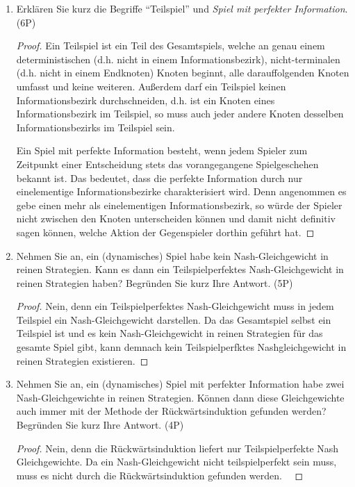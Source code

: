 \documentclass[12pt]{article}
\begin{document}
\begin{enumerate}[label=\alph*\upshape)]
	\item Erklären Sie kurz die Begriffe \enquote{Teilspiel} und \textit{Spiel mit perfekter Information}. (6P)
		\begin{proof}
			Ein Teilspiel ist ein Teil des Gesamtspiels, welche an genau einem deterministischen (d.h. nicht in einem Informationsbezirk), nicht-terminalen (d.h. nicht in einem Endknoten) Knoten beginnt, alle darauffolgenden Knoten umfasst und keine weiteren. Außerdem darf ein Teilspiel keinen Informationsbezirk durchschneiden, d.h. ist ein Knoten eines Informationsbezirk im Teilspiel, so muss auch jeder andere Knoten desselben Informationsbezirks im Teilspiel sein. ~\smallskip
			
			Ein Spiel mit perfekte Information besteht, wenn jedem Spieler zum Zeitpunkt einer Entscheidung stets das vorangegangene Spielgeschehen bekannt ist. Das bedeutet, dass die perfekte Information durch nur einelementige Informationsbezirke charakterisiert wird. Denn angenommen es gebe einen mehr als einelementigen Informationsbezirk, so würde der Spieler nicht zwischen den Knoten unterscheiden können und damit nicht definitiv sagen können, welche Aktion der Gegenspieler dorthin geführt hat.
		\end{proof}
	\item Nehmen Sie an, ein (dynamisches) Spiel habe kein Nash-Gleichgewicht in reinen Strategien. Kann es dann ein Teilspielperfektes Nash-Gleichgewicht in reinen Strategien haben? Begründen Sie kurz Ihre Antwort. (5P)
		\begin{proof}
			Nein, denn ein Teilspielperfektes Nash-Gleichgewicht muss in jedem Teilspiel ein Nash-Gleichgewicht darstellen. Da das Gesamtspiel selbst ein Teilspiel ist und es kein Nash-Gleichgewicht in reinen Strategien für das gesamte Spiel gibt, kann demnach kein Teilspielperfktes Nashgleichgewicht in reinen Strategien existieren.
		\end{proof}
	\item Nehmen Sie an, ein (dynamisches) Spiel mit perfekter Information habe zwei Nash-Gleichgewichte in reinen Strategien. Können dann diese Gleichgewichte auch immer mit der Methode der Rückwärtsinduktion gefunden werden? Begründen Sie kurz Ihre Antwort. (4P)
		\begin{proof}
			Nein, denn die Rückwärtsinduktion liefert nur Teilspielperfekte Nash Gleichgewichte. Da ein Nash-Gleichgewicht nicht teilspielperfekt sein muss, muss es nicht durch die Rückwärtsinduktion gefunden werden. ~\smallskip
			

\end{proof}
\end{enumerate}
\end{document}
